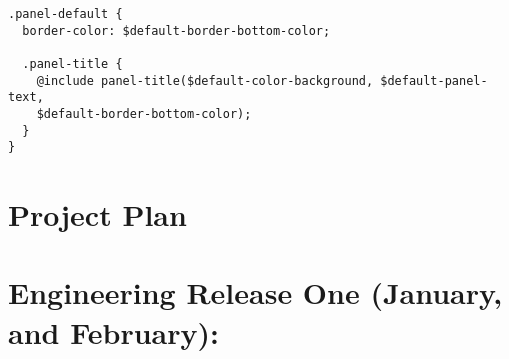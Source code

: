 \begin{lstlisting}[language=CSS3]
.panel-default {
  border-color: $default-border-bottom-color;

  .panel-title {
    @include panel-title($default-color-background, $default-panel-text, 
    $default-border-bottom-color);
  }
}
\end{lstlisting}

\newpage
\section*{Project Plan}
\section*{Engineering Release One (January, and February):}
